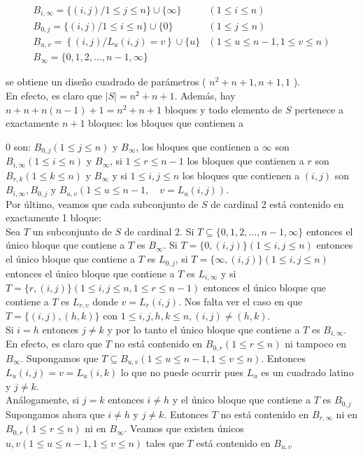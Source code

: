 \documentclass[10pt]{article}
\begin{document}
$$
\begin{array}{ll}
B_{i, \infty}=\{(i, j) / 1 \leq j \leq n\} \cup\{\infty\} & (1 \leq i \leq n) \\
B_{0, j}=\{(i, j) / 1 \leq i \leq n\} \cup\{0\} & (1 \leq j \leq n) \\
B_{u, v}=\left\{(i, j) / L_{u}(i, j)=v\right\} \cup\{u\} & (1 \leq u \leq n-1,1 \leq v \leq n) \\
B_{\infty}=\{0,1,2, \ldots, n-1, \infty\} &
\end{array}
$$

se obtiene un diseño cuadrado de parámetros ( $n^{2}+n+1, n+1,1$ ).\\
En efecto, es claro que $|S|=n^{2}+n+1$. Además, hay $n+n+n(n-1)+1=n^{2}+n+1$ bloques y todo elemento de $S$ pertenece a exactamente $n+1$ bloques: los bloques que contienen a

0 son: $B_{0, j}(1 \leq j \leq n)$ y $B_{\infty}$, los bloques que contienen a $\infty$ son $B_{i, \infty}(1 \leq i \leq n)$ y $B_{\infty}$, si $1 \leq r \leq n-1$ los bloques que contienen a $r$ son $B_{r, k}(1 \leq k \leq n)$ y $B_{\infty}$ y si $1 \leq i, j \leq n$ los bloques que contienen a $(i, j)$ son $B_{i, \infty}, B_{0, j}$ y $B_{u, v}\left(1 \leq u \leq n-1, \quad v=L_{u}(i, j)\right)$.\\
Por último, veamos que cada subconjunto de $S$ de cardinal 2 está contenido en exactamente 1 bloque:\\
Sea $T$ un subconjunto de $S$ de cardinal 2. Si $T \subseteq\{0,1,2, \ldots, n-1, \infty\}$ entonces el único bloque que contiene a $T$ es $B_{\infty}$. Si $T=\{0,(i, j)\}(1 \leq i, j \leq n)$ entonces el único bloque que contiene a $T$ es $L_{0, j}$, si $T=\{\infty,(i, j)\}(1 \leq i, j \leq n)$ entonces el único bloque que contiene a $T$ es $L_{i, \infty}$ y si $T=\{r,(i, j)\}(1 \leq i, j \leq n, 1 \leq r \leq n-1)$ entonces el único bloque que contiene a $T$ es $L_{r, v}$ donde $v=L_{r}(i, j)$. Nos falta ver el caso en que $T=\{(i, j),(h, k)\}$ con $1 \leq i, j, h, k \leq n,(i, j) \neq(h, k)$.\\
Si $i=h$ entonces $j \neq k$ y por lo tanto el único bloque que contiene a $T$ es $B_{i, \infty}$. En efecto, es claro que $T$ no está contenido en $B_{0, r}(1 \leq r \leq n)$ ni tampoco en $B_{\infty}$. Supongamos que $T \subseteq B_{u, v}(1 \leq u \leq n-1,1 \leq v \leq n)$. Entonces $L_{u}(i, j)=v=L_{u}(i, k)$ lo que no puede ocurrir pues $L_{u}$ es un cuadrado latino y $j \neq k$.\\
Análogamente, si $j=k$ entonces $i \neq h$ y el único bloque que contiene a $T$ es $B_{0, j}$\\
Supongamos ahora que $i \neq h$ y $j \neq k$. Entonces $T$ no está contenido en $B_{r, \infty}$ ni en $B_{0, r} (1 \leq r \leq n)$ ni en $B_{\infty}$. Veamos que existen únicos $u, v(1 \leq u \leq n-1,1 \leq v \leq n)$ tales que $T$ está contenido en $B_{u, v}$
\end{document}
